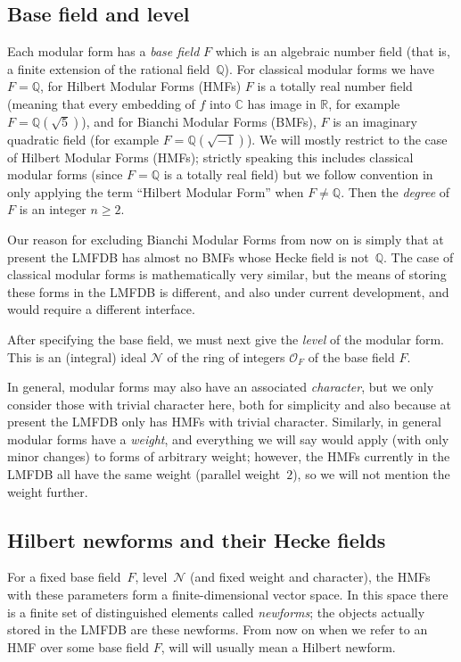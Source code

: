 \documentclass{llncs}
\def\Q{{\mathbb Q}}
\def\R{{\mathbb R}}
\def\C{{\mathbb C}}
\def\N{{\mathcal{N}}}
\def\O{{\mathcal{O}}}
\begin{document}
\subsection{Base field and level}
Each modular form has a \emph{base field} $F$ which is an algebraic
number field (that is, a finite extension of the rational field~$\Q$).
For classical modular forms we have $F=\Q$, for Hilbert Modular Forms
(HMFs) $F$ is a totally real number field (meaning that every
embedding of $f$ into $\C$ has image in $\R$, for example
$F=\Q(\sqrt{5})$), and for Bianchi Modular Forms (BMFs), $F$ is an
imaginary quadratic field (for example $F=\Q(\sqrt{-1})$).  We will
mostly restrict to the case of Hilbert Modular Forms (HMFs); strictly
speaking this includes classical modular forms (since $F=\Q$ is a
totally real field) but we follow convention in only applying the term
``Hilbert Modular Form'' when $F\not=\Q$.  Then the \emph{degree} of
$F$ is an integer $n\ge2$.

Our reason for excluding Bianchi Modular Forms from now on is simply
that at present the LMFDB has almost no BMFs whose Hecke field is
not~$\Q$.  The case of classical modular forms is mathematically very
similar, but the means of storing these forms in the LMFDB is
different, and also under current development, and would require a
different interface.

After specifying the base field, we must next give the \emph{level} of
the modular form.  This is an (integral) ideal $\N$ of the ring of
integers $\O_F$ of the base field $F$.

In general, modular forms may also have an associated
\emph{character}, but we only consider those with trivial character
here, both for simplicity and also because at present the LMFDB only
has HMFs with trivial character.  Similarly, in general modular forms
have a \emph{weight}, and everything we will say would apply (with
only minor changes) to forms of arbitrary weight; however, the HMFs
currently in the LMFDB all have the same weight (parallel weight~$2$),
so we will not mention the weight further.

\subsection{Hilbert newforms and their Hecke fields}
For a fixed base field~$F$, level~$\N$ (and fixed weight and
character), the HMFs with these parameters form a finite-dimensional
vector space.  In this space there is a finite set of distinguished
elements called \emph{newforms}; the objects actually stored in the
LMFDB are these newforms.  From now on when we refer to an HMF over
some base field $F$, will will usually mean a Hilbert newform.
\end{document}
